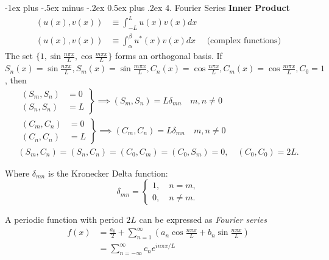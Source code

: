 \documentclass[10pt,landscape]{article}
\makeatletter
\newcommand{\f}{\frac}
\renewcommand{\section}{\@startsection{section}{1}{0mm}%
                                {-1ex plus -.5ex minus -.2ex}%
                                {0.5ex plus .2ex}%
                                {\normalfont\large\bfseries}}
\makeatother
\begin{document}
\begin{multicols}{2}
    \section{4. Fourier Series}
    	\textbf{Inner Product} \\ 
	\begin{align*}
		(u(x),v(x)) &\equiv \int_{-L}^L u(x)v(x)dx \\
		(u(x),v(x)) &\equiv \int_{\alpha}^{\beta} u^*(x)v(x)dx \quad \text{ (complex functions)} 
        \end{align*}
        The set $ \{1,  \sin{\f{n \pi x}{L}}, \cos{\f{m \pi x}{L}} \} $ forms an orthogonal basis. If $S_n(x) = \sin{\f{n \pi x}{L}}, S_m(x) = \sin{\f{m \pi x}{L}}, C_n(x) = \cos{\f{n \pi x}{L}}, C_m(x) = \cos{\f{m \pi x}{L}}, C_0 = 1$, then \\
        \small
        \vspace{0.2cm}
        \begin{align*}
        		\left. \begin{array}{ll}
			(S_m,S_n) &= 0  \\
          		(S_n,S_n)&= L 
                \end{array}
              \right\} \implies (S_m,S_n) = L \delta_{mn} \quad m,n \neq 0 \\
          	\left. \begin{array}{ll}
			(C_m,C_n) &= 0 \\
           		(C_n,C_n) &= L 
                \end{array}
              \right\} \implies (C_m,C_n) = L \delta_{mn} \quad m,n \neq 0 \\
	(S_m,C_n) = (S_n, C_n) = (C_0,C_m) = (C_0,S_m) = 0, \quad (C_0,C_0) = 2L. \end{align*}

    Where $\delta_{mn}$ is the Kronecker Delta function: \\
\normalsize
    $$\delta_{mn} = \begin{cases}
        1,\quad n= m,\\
        0, \quad n\neq m.
    \end{cases}$$

	A periodic function with period $2L$ can be expressed as \emph{Fourier series} \\
	\begin{align*} 
		f(x) &= \f{a_0}{2} + \sum_{n=1}^{\infty} \left( a_n \cos{\f{n \pi x}{L}} + b_n \sin{\f{n \pi x}{L}} \right) \\
		 &= \sum_{n = - \infty}^{\infty} c_n e^{i n \pi x / L} 
	\end{align*}


\end{multicols}
\end{document}

